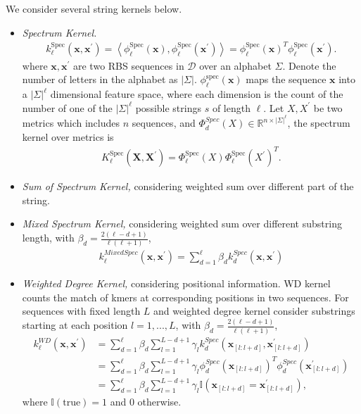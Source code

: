 We consider several string kernels below.

\begin{itemize}
    \item \textit{Spectrum Kernel.}
    \begin{align}
        k_\ell^{\text{Spec}}(\textbf{x}, \textbf{x}^\prime) =\left\langle\phi_{\ell}^{\mathrm{Spec}}(\mathbf{x}), \phi_{\ell}^{\mathrm{Spec}}\left(\mathbf{x}^{\prime}\right)\right\rangle = \phi_{\ell}^{\mathrm{Spec}}(\mathbf{x})^T \phi_{\ell}^{\mathrm{Spec}}\left(\mathbf{x}^{\prime}\right).
    \end{align}
     where $\mathbf{x}, \mathbf{x}^\prime$ are two RBS sequences in $\mathcal{D}$ over an alphabet $\Sigma$. Denote the number of letters in the alphabet as $|\Sigma|$. 
    $\phi_{\ell}^{\mathrm{spec}}(\mathbf{x})$ maps the sequence $\textbf{x}$ into a $|\Sigma|^\ell$ dimensional feature space, where each dimension is the count of the number of one of the $|\Sigma|^\ell$ possible strings $s$ of length $\ell$.  Let $X, X^\prime$ be two metrics which includes $n$ sequences, and $\Phi_d^{Spec}(X) \in \mathbb{R}^{n \times |\Sigma|^{\ell}}$, the spectrum kernel over metrics is 
    \begin{align}
         K_\ell^{\text{Spec}}(\textbf{X}, \textbf{X}^\prime) = \Phi_{\ell}^{\mathrm{Spec}}(X) \Phi_{\ell}^{\mathrm{Spec}}\left(X^{\prime}\right)^T.
    \end{align}
    
    \item \textit{Sum of Spectrum Kernel,} considering weighted sum over different part of the string. 
    
    \item \textit{Mixed Spectrum Kernel,} considering weighted sum over different substring length, with $\beta_d = \frac{2(\ell - d + 1)}{\ell(\ell+1)}$,
        \begin{align}
            k_\ell^{MixedSpec}(\mathbf{x}, \mathbf{x}^\prime) 
            = \sum_{d=1}^{\ell} \beta_d k_d^{Spec}(\mathbf{x}, \mathbf{x}^\prime)
        \end{align}
    \item \textit{Weighted Degree Kernel,} considering positional information. WD kernel counts the match of kmers at corresponding positions in two sequences.
    For sequences with fixed length $L$ and weighted degree kernel consider substrings starting at each position $l = 1, ..., L$, with $\beta_d = \frac{2(\ell - d + 1)}{\ell(\ell+1)}$, \\
    \begin{align}
        k_\ell^{WD}(\mathbf{x}, \mathbf{x}^\prime) 
        &= \sum_{d=1}^{\ell} \beta_d \sum_{l=1}^{L-d+1} \gamma_l k_d^{Spec}(\mathbf{x}_{[l:l+d]}, \mathbf{x}_{[l:l+d]}^\prime)\\
        &= \sum_{d=1}^{\ell} \beta_d \sum_{l=1}^{L-d+1} \gamma_l \phi_d^{Spec}(\mathbf{x}_{[l:l+d]})^T \phi_d^{Spec}(\mathbf{x}_{[l:l+d]}^\prime)\\
        &= \sum_{d=1}^{\ell} \beta_d \sum_{l=1}^{L-d+1} \gamma_l \mathbb{I}(\mathbf{x}_{[l:l+d]} = \mathbf{x}_{[l:l+d]}^\prime),
    \end{align}
    where $\mathbb{I}(\text{true}) = 1$ and 0 otherwise. 
    

\end{itemize}
